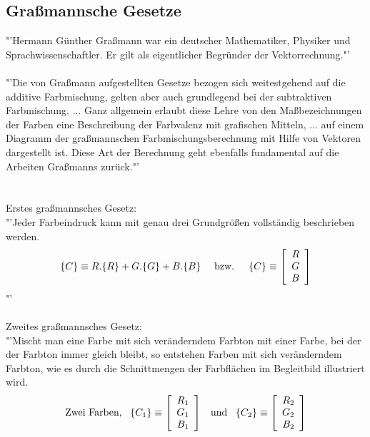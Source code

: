 \documentclass[11pt]{scrartcl}
\begin{document}
\subsection{Graßmannsche Gesetze}
"'Hermann Günther Graßmann war ein deutscher Mathematiker, Physiker und Sprachwissenschaftler. Er gilt als eigentlicher Begründer der
Vektorrechnung."'\\\cite{wikipediaGrassmann}\\
"'Die von Graßmann aufgestellten Gesetze bezogen sich weitestgehend auf die additive Farbmischung, gelten aber auch grundlegend bei der
subtraktiven Farbmischung. ... Ganz allgemein erlaubt diese Lehre von den Maßbezeichnungen der Farben eine Beschreibung der Farbvalenz
mit grafischen Mitteln, ... auf einem Diagramm der graßmannschen Farbmischungsberechnung mit Hilfe von Vektoren dargestellt ist. Diese
Art der Berechnung geht ebenfalls fundamental auf die Arbeiten Graßmanns zurück."'\\\cite{wikipediaGrassmannGestze}\\
\\
Erstes graßmannsches Gesetz:\\
"'Jeder Farbeindruck kann mit genau drei Grundgrößen vollständig beschrieben werden.
\begin{align}\label{Equ:2}
    \{C\} \equiv R.\{R\} + G.\{G\} + B.\{B\} \textrm{\hspace{1em} bzw. \hspace{1em}} \{C\} \equiv \left[ \begin{array}{r}
        R \\
        G \\
        B \\
    \end{array}\right]
\end{align}
"'\cite{wikipediaGrassmannGestze}\\
\\
Zweites graßmannsches Gesetz:\\
"'Mischt man eine Farbe mit sich veränderndem Farbton mit einer Farbe, bei der der Farbton immer gleich bleibt, so entstehen Farben mit
sich veränderndem Farbton, wie es durch die Schnittmengen der Farbflächen im Begleitbild illustriert wird.
\begin{align}\label{Equ:3}
    \textrm{Zwei Farben, \hspace{.5em}} \{C_1\} \equiv \left[ \begin{array}{r}
        R_1 \\
        G_1 \\
        B_1 \\
    \end{array}\right]
    \textrm{\hspace{.5em} und \hspace{.5em}} \{C_2\} \equiv \left[ \begin{array}{r}
        R_2 \\
        G_2 \\
        B_2 \\
    \end{array}\right]
\end{align}
\end{document}
